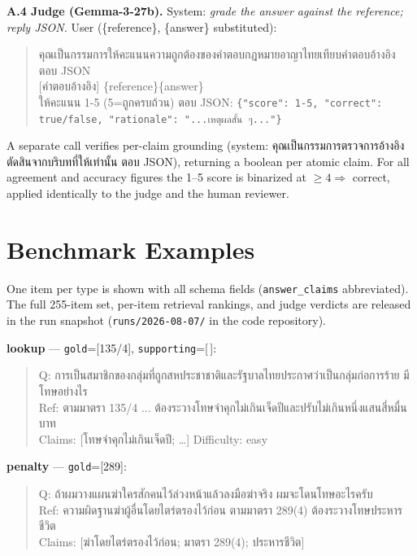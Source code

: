 \documentclass[conference]{IEEEtran}
\providecommand{\TH}{}\renewcommand{\TH}[1]{{\thaifont #1}}
\begin{document}
\smallskip\noindent\textbf{A.4 Judge (Gemma-3-27b).}
System: \emph{grade the answer against the reference; reply JSON.} User (\{reference\}, \{answer\}
substituted):
\begin{quote}\footnotesize
\TH{คุณเป็นกรรมการให้คะแนนความถูกต้องของคำตอบกฎหมายอาญาไทยเทียบคำตอบอ้างอิง ตอบ JSON}\\[2pt]
[\TH{คำตอบอ้างอิง}] \{reference\}\quad [\TH{คำตอบที่ต้องประเมิน}] \{answer\}\\
\TH{ให้คะแนน 1-5 (5=ถูกครบถ้วน) ตอบ JSON:}
\texttt{\{"score": 1-5, "correct": true/false, "rationale": "...\TH{เหตุผลสั้น ๆ}..."\}}
\end{quote}
A separate call verifies per-claim grounding (system: \TH{คุณเป็นกรรมการตรวจการอ้างอิง ตัดสินจากบริบทที่ให้เท่านั้น ตอบ JSON}), returning a boolean per atomic claim. For all agreement and accuracy
figures the 1--5 score is binarized at ${\ge}4\Rightarrow$ correct, applied identically to the judge
and the human reviewer.

\section{Benchmark Examples}
\label{app:examples}

One item per type is shown with all schema fields (\texttt{answer\_claims} abbreviated). The full
255-item set, per-item retrieval rankings, and judge verdicts are released in the run snapshot
(\texttt{runs/2026-08-07/} in the code repository).

\smallskip\noindent\textbf{lookup} --- \texttt{gold}=[135/4], \texttt{supporting}=[\,]:
\begin{quote}\footnotesize
Q: \TH{การเป็นสมาชิกของกลุ่มที่ถูกสหประชาชาติและรัฐบาลไทยประกาศว่าเป็นกลุ่มก่อการร้าย มีโทษอย่างไร}\\
Ref: \TH{ตามมาตรา 135/4 ... ต้องระวางโทษจำคุกไม่เกินเจ็ดปีและปรับไม่เกินหนึ่งแสนสี่หมื่นบาท}\\
Claims: [\TH{โทษจำคุกไม่เกินเจ็ดปี}; \dots] \quad Difficulty: easy
\end{quote}

\smallskip\noindent\textbf{penalty} --- \texttt{gold}=[289]:
\begin{quote}\footnotesize
Q: \TH{ถ้าผมวางแผนฆ่าใครสักคนไว้ล่วงหน้าแล้วลงมือฆ่าจริง ผมจะโดนโทษอะไรครับ}\\
Ref: \TH{ความผิดฐานฆ่าผู้อื่นโดยไตร่ตรองไว้ก่อน ตามมาตรา 289(4) ต้องระวางโทษประหารชีวิต}\\
Claims: [\TH{ฆ่าโดยไตร่ตรองไว้ก่อน}; \TH{มาตรา 289(4)}; \TH{ประหารชีวิต}]
\end{quote}
\end{document}
